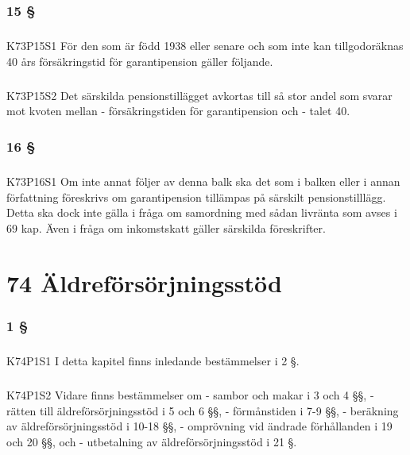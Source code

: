 \documentclass[a4paper,notitlepage,openany,10pt]{book}
\begin{document}
\subsection*{15 §}
\paragraph*{}
{\tiny K73P15S1}
För den som är född 1938 eller senare och som inte kan tillgodoräknas 40 års försäkringstid för garantipension gäller följande.
\paragraph*{}
{\tiny K73P15S2}
Det särskilda pensionstillägget avkortas till så stor andel som svarar mot kvoten mellan
\newline - försäkringstiden för garantipension och
\newline - talet 40.
\subsection*{16 §}
\paragraph*{}
{\tiny K73P16S1}
Om inte annat följer av denna balk ska det som i balken eller i annan författning föreskrivs om garantipension tillämpas på särskilt pensionstilllägg. Detta ska dock inte gälla i fråga om samordning med sådan livränta som avses i 69 kap. Även i fråga om inkomstskatt gäller särskilda föreskrifter.
\chapter*{74 Äldreförsörjningsstöd}
\subsection*{1 §}
\paragraph*{}
{\tiny K74P1S1}
I detta kapitel finns inledande bestämmelser i 2 §.
\paragraph*{}
{\tiny K74P1S2}
Vidare finns bestämmelser om
\newline - sambor och makar i 3 och 4 §§,
\newline - rätten till äldreförsörjningsstöd i 5 och 6 §§,
\newline - förmånstiden i 7-9 §§,
\newline - beräkning av äldreförsörjningsstöd i 10-18 §§,
\newline - omprövning vid ändrade förhållanden i 19 och 20 §§, och
\newline - utbetalning av äldreförsörjningsstöd i 21 §.
\end{document}
